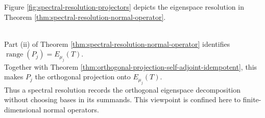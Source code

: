 Figure \ref{fig:spectral-resolution-projectors} depicts the eigenspace resolution in Theorem \ref{thm:spectral-resolution-normal-operator}.

\begin{illustrationfigure}[H]
  \centering
  
  \caption{Pairwise orthogonal spectral projections resolve $I_{\mathcal{V}}$ and reconstruct $T$ by eigenvalue weights.}
  \label{fig:spectral-resolution-projectors}
\end{illustrationfigure}

\begin{perspective} \label{per:spectral-resolution-as-orthogonal-resolution} \\
Part (ii) of Theorem \ref{thm:spectral-resolution-normal-operator} identifies $\operatorname{range}(P_j)=E_{\mu_j}(T)$.\\
Together with Theorem \ref{thm:orthogonal-projection-self-adjoint-idempotent}, this makes $P_j$ the orthogonal projection onto $E_{\mu_j}(T)$.\\
Thus a spectral resolution records the orthogonal eigenspace decomposition without choosing bases in its summands. This viewpoint is confined here to finite-dimensional normal operators.
\end{perspective}

